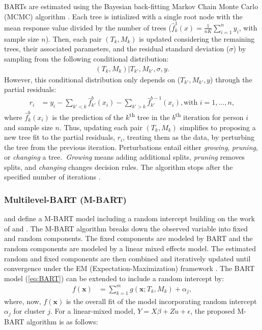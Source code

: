 \documentclass[10pt, a4paper, titlepage]{article}
\begin{document}
BARTs are estimated using the Bayesian back-fitting Markov Chain Monte Carlo (MCMC) algorithm \citep{chipman2010, hill2020, chipman2006, chipman1998,james2021}. Each tree is intialized with a single root node with the mean response value divided by the number of trees ($\hat{f}^1_k(x) = \frac{1}{nK}\sum_{i = 1}^{n}y_i$, with sample size $n$). Then, each pair $(T_k, M_k)$ is updated considering the remaining trees, their associated parameters, and the residual standard deviation ($\sigma$) by sampling from the following conditional distribution: 
\begin{align}
\label{eq:backfitting}
    (T_k, M_k)|T_{k'}, M_{k'}, \sigma, y.
\end{align} However, this conditional distribution only depends on ($T_{k'}, M_{k'}, y$) through the partial residuals:
\begin{align}
    \label{eq:partialresiduals}
    r_i &= y_i - \sum_{k' < k} \hat{f}^{b}_{k'}(x_{i}) - \sum_{k' > k} \hat{f}^{b-1}_{k'}(x_{i}), \text{with } i = 1, \dots, n,
    \end{align} where $\hat{f}^{b}_{k}(x_{i})$ is the prediction of the $k$\textsuperscript{th} tree in the $b$\textsuperscript{th} iteration for person $i$ and sample size $n$. Thus, updating each pair $(T_k, M_k)$ simplifies to proposing a new tree fit to the partial residuals, $r_{i}$, treating them as the data, by perturbing the tree from the previous iteration. Perturbations entail either \textit{growing}, \textit{pruning}, or \textit{changing} a tree.~\textit{Growing} means adding additional splits, \textit{pruning} removes splits, and \textit{changing} changes decision rules. The algorithm stops after the specified number of iterations \citep{chipman2010, hill2020, chipman2006, chipman1998, james2021}.

\subsubsection{Multilevel-BART (M-BART)}
\citet{chen2020, wagner2020} and \citet{tan2016} define a M-BART model including a random intercept building on the work of \citet{sela2012} and \citet{lin2019}. The M-BART algorithm breaks down the observed variable into fixed and random components. The fixed components are modeled by BART and the random components are modeled by a linear mixed effects model. The estimated random and fixed components are then combined and iteratively updated until convergence under the EM (Expectation-Maximization) framework \citep{chen2020, wagner2020, tan2016}. The BART model (\ref{eq:BART}) can be extended to include a random intercept by:
\begin{align} 
\label{eq:M-BART}
f(\textbf{x}) &= \sum^{m}_{k=1}g(\textbf{x}; T_{k}, M_{k}) + \alpha_{j}, 
\end{align} where, now, $f(\textbf{x})$ is the overall fit of the model incorporating random intercept $\alpha_{j}$ for cluster $j$. For a linear-mixed model, $Y = X\beta + Zu + \epsilon$, the proposed M-BART algorithm is as follows: 
\end{document}
